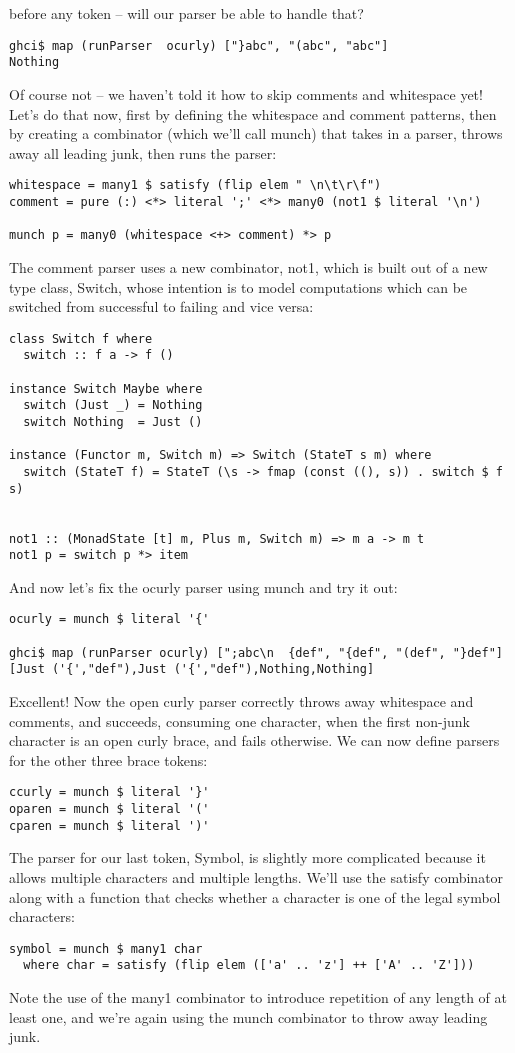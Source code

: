 \documentclass{tmr}
\begin{document}
before any token -- will our parser be able to handle that?
\begin{verbatim}
ghci$ map (runParser  ocurly) ["}abc", "(abc", "abc"]
Nothing
\end{verbatim}
Of course not -- we haven't told it how to skip comments and whitespace yet!
Let's do that now, first by defining the whitespace and comment patterns, then
by creating a combinator (which we'll call munch) that takes in a parser, 
throws away all leading junk, then runs the parser:
\begin{verbatim}
whitespace = many1 $ satisfy (flip elem " \n\t\r\f")
comment = pure (:) <*> literal ';' <*> many0 (not1 $ literal '\n')

munch p = many0 (whitespace <+> comment) *> p
\end{verbatim}
The comment parser uses a new combinator, not1, which is built out of a new type class,
Switch, whose intention is to model computations which can be switched from successful
to failing and vice versa:
\begin{verbatim}
class Switch f where
  switch :: f a -> f ()

instance Switch Maybe where
  switch (Just _) = Nothing
  switch Nothing  = Just ()

instance (Functor m, Switch m) => Switch (StateT s m) where
  switch (StateT f) = StateT (\s -> fmap (const ((), s)) . switch $ f s)


not1 :: (MonadState [t] m, Plus m, Switch m) => m a -> m t
not1 p = switch p *> item
\end{verbatim}
And now let's fix the ocurly parser using munch and try it out:
\begin{verbatim}
ocurly = munch $ literal '{'

ghci$ map (runParser ocurly) [";abc\n  {def", "{def", "(def", "}def"]
[Just ('{',"def"),Just ('{',"def"),Nothing,Nothing]
\end{verbatim}
Excellent!  Now the open curly parser correctly throws away whitespace and comments,
and succeeds, consuming one character, when the first non-junk character is an open 
curly brace, and fails otherwise.
We can now define parsers for the other three brace tokens:
\begin{verbatim}
ccurly = munch $ literal '}'
oparen = munch $ literal '('
cparen = munch $ literal ')'
\end{verbatim}
The parser for our last token, Symbol, is slightly more complicated because it allows
multiple characters and multiple lengths.  We'll use the satisfy combinator along with 
a function that checks whether a character is one of the legal symbol characters:
\begin{verbatim}
symbol = munch $ many1 char
  where char = satisfy (flip elem (['a' .. 'z'] ++ ['A' .. 'Z']))
\end{verbatim}
Note the use of the many1 combinator to introduce repetition of any length of at least one,
and we're again using the munch combinator to throw away leading junk.
\end{document}
